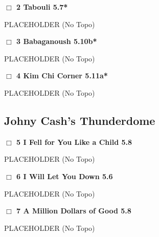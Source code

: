 \begin{multicols}{2}
\needspace{1.5cm}
\label{rt:Tabouli}
\colorbox{green!20}{
\parbox{0.95\linewidth}{
\hspace{-1ex}\textbf{$\Box$
2 Tabouli 5.7*  
}}}
\begin{adjustwidth}{1.3em}{}			
PLACEHOLDER
  (No Topo)
\end{adjustwidth}




\needspace{1.5cm}
\label{rt:Babaganoush}
\colorbox{RoyalBlue!20}{
\parbox{0.95\linewidth}{
\hspace{-1ex}\textbf{$\Box$
3 Babaganoush 5.10b*  
}}}
\begin{adjustwidth}{1.3em}{}			
PLACEHOLDER
  (No Topo)
\end{adjustwidth}




\needspace{1.5cm}
\label{rt:Kim Chi Corner}
\colorbox{RoyalBlue!20}{
\parbox{0.95\linewidth}{
\hspace{-1ex}\textbf{$\Box$
4 Kim Chi Corner 5.11a*  
}}}
\begin{adjustwidth}{1.3em}{}			
PLACEHOLDER
  (No Topo)
\end{adjustwidth}





\needspace{1.5cm}
\subsection*{Johny Cash's Thunderdome}\label{bf:Johny Cash's Thunderdome}
	


\needspace{1.5cm}
\label{rt:I Fell for You Like a Child}
\colorbox{green!20}{
\parbox{0.95\linewidth}{
\hspace{-1ex}\textbf{$\Box$
5 I Fell for You Like a Child 5.8  
}}}
\begin{adjustwidth}{1.3em}{}			
PLACEHOLDER
  (No Topo)
\end{adjustwidth}




\needspace{1.5cm}
\label{rt:I Will Let You Down}
\colorbox{green!20}{
\parbox{0.95\linewidth}{
\hspace{-1ex}\textbf{$\Box$
6 I Will Let You Down 5.6  
}}}
\begin{adjustwidth}{1.3em}{}			
PLACEHOLDER
  (No Topo)
\end{adjustwidth}




\needspace{1.5cm}
\label{rt:A Million Dollars of Good}
\colorbox{green!20}{
\parbox{0.95\linewidth}{
\hspace{-1ex}\textbf{$\Box$
7 A Million Dollars of Good 5.8  
}}}
\begin{adjustwidth}{1.3em}{}			
PLACEHOLDER
  (No Topo)
\end{adjustwidth}





\end{multicols}
